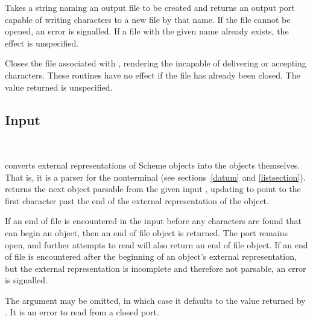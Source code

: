 \begin{entry}{%
}

Takes a string naming an output file to be created and returns an output
port capable of writing characters to a new file by that name.  If the file
cannot be opened, an error is signalled.  If a file with the given name
already exists, the effect is unspecified.

\end{entry}


\begin{entry}{%
}

Closes the file associated with , rendering the 
incapable of delivering or accepting characters.  
These routines have no effect if the file has already been closed.
The value returned is unspecified.



\end{entry}


\subsection{Input}
\label{inputsection}

\noindent \hbox{ }  %
\vspace{-5ex}

\begin{entry}{%
}

 converts external representations of Scheme objects into the
objects themselves.  That is, it is a parser for the nonterminal
 (see sections~\ref{datum} and
\ref{listsection}).   returns the next
object parsable from the given input , updating  to point to
the first character past the end of the external representation of the object.

\vest If an end of file is encountered in the input before any
characters are found that can begin an object, then an end of file
object is returned.  \todo{} The port remains open, and further attempts
to read will also return an end of file object.  If an end of file is
encountered after the beginning of an object's external representation,
but the external representation is incomplete and therefore not parsable,
an error is signalled.

The  argument may be omitted, in which case it defaults to the
value returned by .  It is an error to read from
a closed port.
\end{entry}

